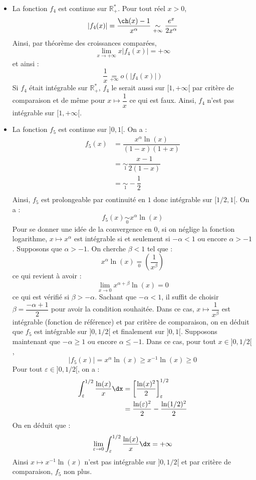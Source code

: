 \documentclass[a4paper,10pt]{report}
\begin{document}
\begin{itemize}
\item La fonction $f_4$ est continue sur $\mathbb{R}_+^*$. Pour tout réel $x>0$,
$$ \vert f_4(x) \vert = \dfrac{\ch(x)-1}{x^{\alpha}} \underset{+ \infty} {\sim}\dfrac{e^x}{2x^{\alpha}}$$
Ainsi, par théorème des croissances comparées, 
$$ \lim_{x \rightarrow + \infty} x \vert f_4(x) \vert = + \infty$$
et ainsi :
$$ \dfrac{1}{x} \underset{+\infty}{=} o (\vert f_4(x) \vert)$$
Si $f_4$ était intégrable sur $\mathbb{R}_+^{*}$, $f_4$ le serait aussi sur $[1, + \infty[$ par critère de comparaison et de même pour $x \mapsto \dfrac{1}{x}$ ce qui est faux. Ainsi, $f_4$ n'est pas intégrable sur $[1, + \infty[$.
\item La fonction $f_5$ est continue sur $]0,1[$. On a :
\begin{align*}
 f_5(x) & = \dfrac{x^{\alpha} \ln(x)}{(1-x)(1+x)} \\
 & = \underset{1}{\sim} \dfrac{x-1}{2(1-x)} \\
 & = \underset{1}{\sim} - \dfrac{1}{2} \\
 \end{align*}
 Ainsi, $f_5$ est prolongeable par continuité en $1$ donc intégrable sur $[1/2,1[$. On a :
 $$ f_5(x) \underset{0}{\sim} x^{\alpha} \ln(x)$$
Pour se donner une idée de la convergence en $0$, si on néglige la fonction logarithme, $x \mapsto x^{\alpha}$ est intégrable si et seulement si $- \alpha <1$ ou encore $\alpha>-1$. Supposons que $\alpha>-1$. On cherche $\beta <1$ tel que :
$$ x^{\alpha} \ln(x) \underset{0}{=} \left( \dfrac{1}{x^{\beta}} \right)$$
ce qui revient à avoir :
$$ \lim_{x \rightarrow 0} x^{\alpha+ \beta} \ln(x) = 0$$
ce qui est vérifié si $\beta > - \alpha$. Sachant que $-\alpha <1$, il suffit de choisir $\beta = \dfrac{-\alpha+1}{2}$ pour avoir la condition souhaitée. Dans ce cas, $x \mapsto \dfrac{1}{x^{\beta}}$ est intégrable (fonction de référence) et par critère de comparaison, on en déduit que $f_5$ est intégrable sur $]0,1/2[$ et finalement sur $]0,1[$. Supposons maintenant que $- \alpha \geq 1$ ou encore $\alpha \leq -1$. Dans ce cas, pour tout $x \in ]0,1/2[$,
$$ \vert f_5(x) \vert= x^{\alpha} \ln(x) \geq x^{-1} \ln(x) \geq 0$$
Pour tout $\varepsilon \in ]0,1/2[$, on a :
\begin{align*}
\int_{\varepsilon}^{1/2} \dfrac{\ln(x)}{x} \dx & = \left[ \dfrac{\ln(x)^2}{2} \right]_{\varepsilon}^{1/2} \\
& = \dfrac{\ln(\varepsilon)^2}{2} - \dfrac{\ln(1/2)^2}{2}
\end{align*}
On en déduit que :
$$ \lim_{\varepsilon \rightarrow 0}\int_{\varepsilon}^{1/2} \dfrac{\ln(x)}{x} \dx = + \infty$$
Ainsi $x \mapsto x^{-1} \ln(x)$ n'est pas intégrable sur $]0,1/2[$ et par critère de comparaison, $f_5$ non plus.


\end{itemize}
\end{document}
